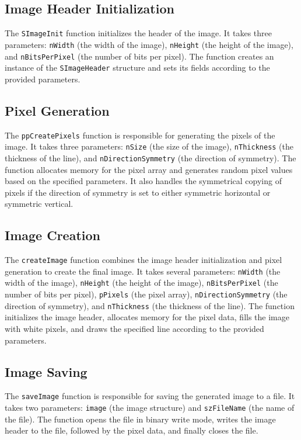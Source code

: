 \documentclass{report}
\begin{document}
\subsection{Image Header Initialization}
The \texttt{SImageInit} function initializes the header of the image. It takes three parameters: \texttt{nWidth} (the width of the image), \texttt{nHeight} (the height of the image), and \texttt{nBitsPerPixel} (the number of bits per pixel). The function creates an instance of the \texttt{SImageHeader} structure and sets its fields according to the provided parameters.

\subsection{Pixel Generation}
The \texttt{ppCreatePixels} function is responsible for generating the pixels of the image. It takes three parameters: \texttt{nSize} (the size of the image), \texttt{nThickness} (the thickness of the line), and \texttt{nDirectionSymmetry} (the direction of symmetry). The function allocates memory for the pixel array and generates random pixel values based on the specified parameters. It also handles the symmetrical copying of pixels if the direction of symmetry is set to either symmetric horizontal or symmetric vertical.

\subsection{Image Creation}
The \texttt{createImage} function combines the image header initialization and pixel generation to create the final image. It takes several parameters: \texttt{nWidth} (the width of the image), \texttt{nHeight} (the height of the image), \texttt{nBitsPerPixel} (the number of bits per pixel), \texttt{pPixels} (the pixel array), \texttt{nDirectionSymmetry} (the direction of symmetry), and \texttt{nThickness} (the thickness of the line). The function initializes the image header, allocates memory for the pixel data, fills the image with white pixels, and draws the specified line according to the provided parameters.

\subsection{Image Saving}
The \texttt{saveImage} function is responsible for saving the generated image to a file. It takes two parameters: \texttt{image} (the image structure) and \texttt{szFileName} (the name of the file). The function opens the file in binary write mode, writes the image header to the file, followed by the pixel data, and finally closes the file.
\end{document}
